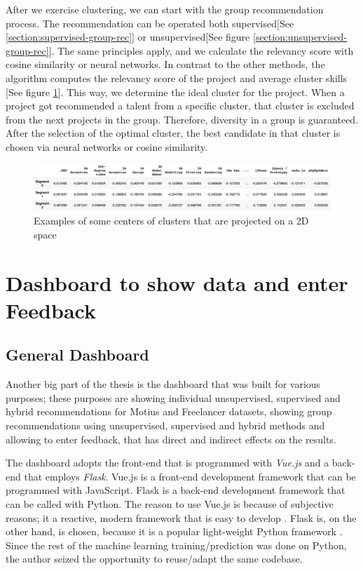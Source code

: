 After we exercise clustering, we can start with the group recommendation process. The recommendation can be operated both supervised[See \ref{section:supervised-group-rec}] or unsupervised[See figure \ref{section:unsupervised-group-rec}]. The same principles apply, and we calculate the relevancy score with cosine similarity or neural networks. In contrast to the other methods, the algorithm computes the relevancy score of the project and average cluster skills [See figure \ref{fig:cluster-centers-matrix}]. This way, we determine the ideal cluster for the project. When a project got recommended a talent from a specific cluster, that cluster is excluded from the next projects in the group. Therefore, diversity in a group is guaranteed. After the selection of the optimal cluster, the best candidate in that cluster is chosen via neural networks or cosine similarity.

 \begin{figure}[htp]
	\centering
	\includegraphics[width=\textwidth]{figures/ClusterCentersMatrix.png}
	\caption{Examples of some centers of clusters that are projected on a 2D space}
	\label{fig:cluster-centers-matrix}
\end{figure}



\section{Dashboard to show data and enter Feedback}

\subsection{General Dashboard}

Another big part of the thesis is the dashboard that was built for various purposes; these purposes are showing individual unsupervised, supervised and hybrid recommendations for Motius and Freelancer datasets, showing group recommendations using unsupervised, supervised and hybrid methods and allowing to enter feedback, that has direct and indirect effects on the results.

The dashboard adopts the front-end that is programmed with \textit{Vue.js} and a back-end that employs \textit{Flask}. Vue.js is a front-end development framework that can be programmed with JavaScript. Flask is a back-end development framework that can be called with Python. The reason to use Vue.js is because of subjective reasons; it a reactive, modern framework that is easy to develop \cite{you2018vue}. Flask is, on the other hand, is chosen, because it is a popular light-weight Python framework \cite{grinberg2018flask}. Since the rest of the machine learning training/prediction was done on Python, the author seized the opportunity to reuse/adapt the same codebase. 

